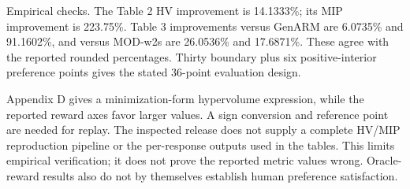 \documentclass[10pt]{article}
\begin{document}
Empirical checks. The Table 2 HV improvement is 14.1333\%; its MIP improvement is 223.75\%. Table 3 improvements versus GenARM are 6.0735\% and 91.1602\%, and versus MOD-w2s are 26.0536\% and 17.6871\%. These agree with the reported rounded percentages. Thirty boundary plus six positive-interior preference points gives the stated 36-point evaluation design.\par
Appendix D gives a minimization-form hypervolume expression, while the reported reward axes favor larger values. A sign conversion and reference point are needed for replay. The inspected release does not supply a complete HV/MIP reproduction pipeline or the per-response outputs used in the tables. This limits empirical verification; it does not prove the reported metric values wrong. Oracle-reward results also do not by themselves establish human preference satisfaction.\par
\end{document}
